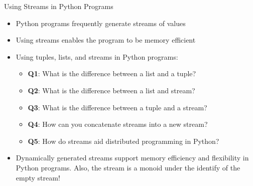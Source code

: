\documentclass[14pt,aspectratio=169]{beamer}
\begin{document}
%
\begin{frame}{Using Streams in Python Programs}
  \begin{itemize}
    \item Python programs frequently generate streams of values
      \vspace*{-.2in}
    \item Using streams enables the program to be memory efficient
      \vspace*{-.2in}
    \item Using tuples, lists, and streams in Python programs:
      \begin{itemize}
        \item {\bf Q1}: What is the difference between a list and a tuple?
        \item {\bf Q2}: What is the difference between a list and stream?
        \item {\bf Q3}: What is the difference between a tuple and a stream?
        \item {\bf Q4}: How can you concatenate streams into a new stream?
        \item {\bf Q5}: How do streams aid distributed programming in Python?
      \end{itemize}
      \vspace*{-.2in}
    \item Dynamically generated streams support memory efficiency and
      flexibility in Python programs. Also, the stream is a monoid under the
      identify of the empty stream!
  \end{itemize}
\end{frame}
\end{document}
